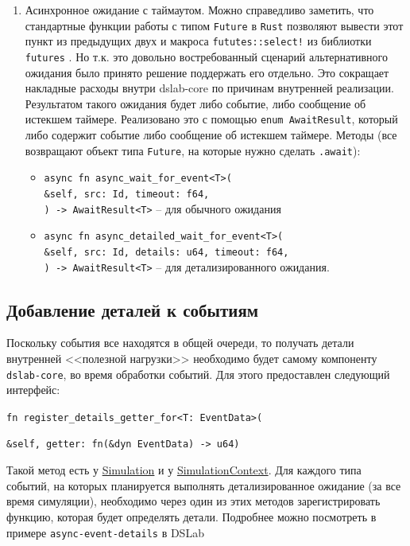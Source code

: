 \begin{enumerate}
\begin{itemize}
    \end{itemize}
    \item Асинхронное ожидание с таймаутом. Можно справедливо заметить, что стандартные функции работы с типом \texttt{Future} в \texttt{Rust} позволяют вывести этот пункт из предыдущих двух и макроса \texttt{fututes::select!} из библиотки \texttt{futures} \cite{rust-futures}. Но т.к. это довольно востребованный сценарий альтернативного ожидания было принято решение поддержать его отдельно. Это сокращает накладные расходы внутри dslab-core по причинам внутренней реализации. Результатом такого ожидания будет либо событие, либо сообщение об истекшем таймере. Реализовано это с помощью \texttt{enum AwaitResult}, который либо содержит событие либо сообщение об истекшем таймере. Методы (все возвращают объект типа \texttt{Future}, на которые нужно сделать \texttt{.await}):
    \begin{itemize}
        \item \texttt{async fn async\_wait\_for\_event<T>(\\\&self, src: Id, timeout: f64,\\) -> AwaitResult<T>} -- для обычного ожидания
        \item \texttt{async fn async\_detailed\_wait\_for\_event<T>(\\\&self, src: Id, details: u64, timeout: f64,\\) -> AwaitResult<T>} -- для детализированного ожидания. 
    \end{itemize}
\end{enumerate}

\subsection{Добавление деталей к событиям}

Поскольку события все находятся в общей очереди, то получать детали внутренней <<полезной нагрузки>> необходимо будет самому компоненту \texttt{dslab-core}, во время обработки событий. Для этого предоставлен следующий интерфейс:
\begin{flushleft}
     \texttt{fn register\_details\_getter\_for<T: EventData>(}
\end{flushleft}
\vspace{-1.2cm}
\begin{flushright}
      \texttt{\&self, getter: fn(\&dyn EventData) -> u64)}
\end{flushright}

Такой метод есть у \hyperref[Simulation]{Simulation} и у \hyperref[SimulationContext]{SimulationContext}. Для каждого типа событий, на которых планируется выполнять детализированное ожидание (за все время симуляции), необходимо через один из этих методов зарегистрировать функцию, которая будет определять детали. Подробнее можно посмотреть в примере \texttt{async-event-details} в DSLab \cite{async-event-details-example}

